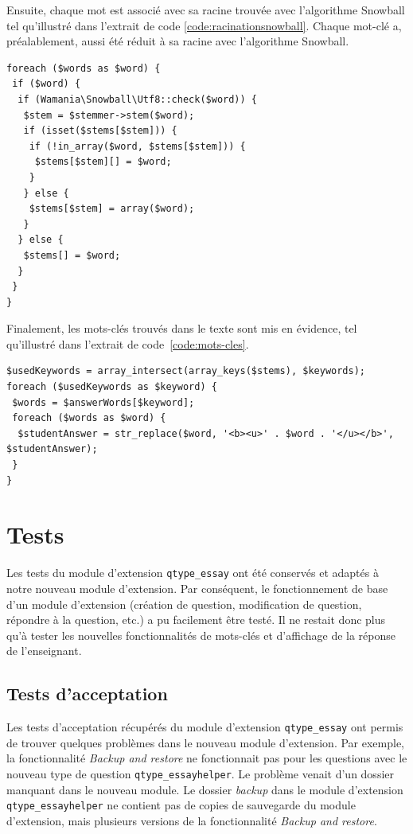 Ensuite, chaque mot est associ\'e avec sa racine trouv\'ee avec l'algorithme Snowball tel qu'illustr\'e dans l'extrait de code \ref{code:racinationsnowball}.
Chaque mot-cl\'e a, pr\'ealablement, aussi \'et\'e r\'eduit \`a sa racine avec l'algorithme Snowball.
\begin{lstfloat}
\begin{lstlisting}[frame=l]
foreach ($words as $word) {
 if ($word) {
  if (Wamania\Snowball\Utf8::check($word)) {
   $stem = $stemmer->stem($word);
   if (isset($stems[$stem])) {
    if (!in_array($word, $stems[$stem])) {
     $stems[$stem][] = $word;
    }
   } else {
    $stems[$stem] = array($word);
   }
  } else {
   $stems[] = $word;
  }
 }
}
\end{lstlisting}
\caption{Racination des mots avec Snowball.}
\label{code:racinationsnowball}
\end{lstfloat}

Finalement, les mots-cl\'es trouv\'es dans le texte sont mis en \'evidence, tel qu'illustr\'e dans l'extrait de code~\ref{code:mots-cles}.

\begin{lstfloat}
\begin{lstlisting}[frame=l]
$usedKeywords = array_intersect(array_keys($stems), $keywords);
foreach ($usedKeywords as $keyword) {
 $words = $answerWords[$keyword];
 foreach ($words as $word) {
  $studentAnswer = str_replace($word, '<b><u>' . $word . '</u></b>', $studentAnswer);
 }
}
\end{lstlisting}
\caption{Mise en \'evidence des mots-cl\'es trouv\'es.}
\label{code:mots-cles}
\end{lstfloat}

\section{Tests} \label{dev_test}
Les tests du module d'extension \texttt{qtype\_essay} ont \'et\'e conserv\'es et adapt\'es \`a notre nouveau module d'extension.
Par cons\'equent, le fonctionnement de base d'un module d'extension (cr\'eation de question, modification de question, r\'epondre \`a la question, etc.) a pu facilement \^etre test\'e.
Il ne restait donc plus qu'\`a tester les nouvelles fonctionnalit\'es de mots-cl\'es et d'affichage de la r\'eponse de l'enseignant.

\subsection{Tests d'acceptation} \label{dev_test_acceptation}
Les tests d'acceptation r\'ecup\'er\'es du module d'extension \texttt{qtype\_essay} ont permis de trouver quelques probl\`emes  dans le nouveau module d'extension.
Par exemple, la fonctionnalit\'e \textit{Backup and restore} ne fonctionnait pas pour les questions avec le nouveau type de question \texttt{qtype\_essayhelper}.
Le probl\`eme venait d'un dossier manquant dans le nouveau module.
Le dossier \textit{backup} dans le module d'extension \texttt{qtype\_essayhelper} ne contient pas de copies de sauvegarde du module d'extension, mais plusieurs versions de la fonctionnalit\'e \textit{Backup and restore}.

